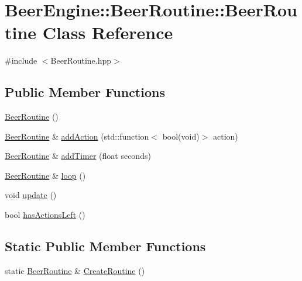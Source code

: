 \hypertarget{class_beer_engine_1_1_beer_routine_1_1_beer_routine}{}\section{Beer\+Engine\+:\+:Beer\+Routine\+:\+:Beer\+Routine Class Reference}
\label{class_beer_engine_1_1_beer_routine_1_1_beer_routine}


{\ttfamily \#include $<$Beer\+Routine.\+hpp$>$}

\subsection*{Public Member Functions}
\begin{DoxyCompactItemize}
\item 
\mbox{\hyperlink{class_beer_engine_1_1_beer_routine_1_1_beer_routine_ad3cedf2bbe2719e1a8b951f16a416ca9}{Beer\+Routine}} ()
\item 
\mbox{\hyperlink{class_beer_engine_1_1_beer_routine_1_1_beer_routine}{Beer\+Routine}} \& \mbox{\hyperlink{class_beer_engine_1_1_beer_routine_1_1_beer_routine_abd6b5782ae6bc5f951d4df91f700fdc3}{add\+Action}} (std\+::function$<$ bool(void)$>$ action)
\item 
\mbox{\hyperlink{class_beer_engine_1_1_beer_routine_1_1_beer_routine}{Beer\+Routine}} \& \mbox{\hyperlink{class_beer_engine_1_1_beer_routine_1_1_beer_routine_a174692c444eca2b7e6ba55389bc73f0b}{add\+Timer}} (float seconds)
\item 
\mbox{\hyperlink{class_beer_engine_1_1_beer_routine_1_1_beer_routine}{Beer\+Routine}} \& \mbox{\hyperlink{class_beer_engine_1_1_beer_routine_1_1_beer_routine_a2e521613bf057c806b73a2b0855f7a1f}{loop}} ()
\item 
void \mbox{\hyperlink{class_beer_engine_1_1_beer_routine_1_1_beer_routine_af210700097e82efb5c60ef68c73cb900}{update}} ()
\item 
bool \mbox{\hyperlink{class_beer_engine_1_1_beer_routine_1_1_beer_routine_ac165279d864e7ba3fafb758ea070ce7b}{has\+Actions\+Left}} ()
\end{DoxyCompactItemize}
\subsection*{Static Public Member Functions}
\begin{DoxyCompactItemize}
\item 
static \mbox{\hyperlink{class_beer_engine_1_1_beer_routine_1_1_beer_routine}{Beer\+Routine}} \& \mbox{\hyperlink{class_beer_engine_1_1_beer_routine_1_1_beer_routine_a07e9e9623fbdf1899b2fd1d163eca54a}{Create\+Routine}} ()
\end{DoxyCompactItemize}


